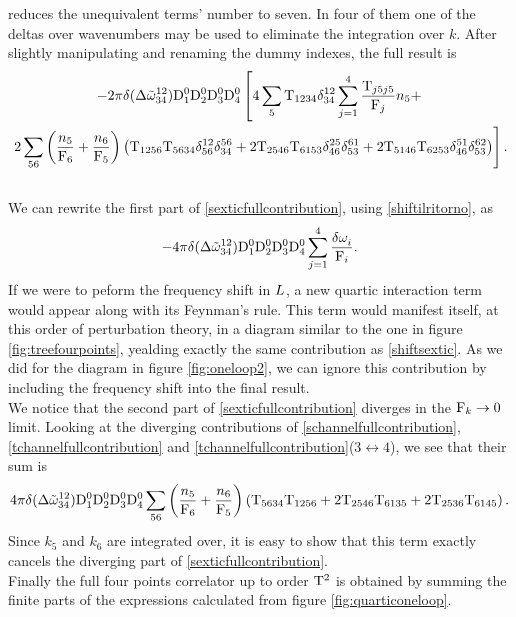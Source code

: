 reduces the unequivalent terms' number to seven. In four of them one of the deltas over wavenumbers may be used to eliminate the integration over $k$. After slightly manipulating
and renaming the dummy indexes, the full result is 
\begin{multline}
    -2\pi \delta(\Delta{\tilde{\omega}}^{12}_{34})\mathrm{D}_1^0\mathrm{D}_2^0\mathrm{D}_3^0\mathrm{D}_4^0\left[ 4\sum_5\mathrm{T}_{1234}\delta^{12}_{34} \sum_{j=1}^{4}\frac{\mathrm{T}_{j5j5}}{\mathrm{F}_j}n_5 + \right.\\ 
    \left.  2\sum_{56}\left( \frac{n_5}{\mathrm{F}_6} + \frac{n_6}{\mathrm{F}_5} \right)\left( \mathrm{T}_{1256}\mathrm{T}_{5634}\delta^{12}_{56}\delta^{56}_{34} 
    + 2\mathrm{T}_{2546}\mathrm{T}_{6153}\delta^{25}_{46}\delta^{61}_{53}
    + 2\mathrm{T}_{5146}\mathrm{T}_{6253}\delta^{51}_{46}\delta^{62}_{53} \right) \right].
    \label{sexticfullcontribution}
\end{multline}
\\
We can rewrite the first part of \eqref{sexticfullcontribution}, using \eqref{shiftilritorno}, as 
\begin{equation}
    -4\pi \delta(\Delta{\tilde{\omega}}^{12}_{34})\mathrm{D}_1^0\mathrm{D}_2^0\mathrm{D}_3^0\mathrm{D}_4^0\sum_{j=1}^{4}\frac{\delta \omega^{}_i}{\mathrm{F}_i}.
    \label{shiftsextic}
\end{equation}
If we were to peform the frequency shift in $L$, a new quartic interaction term would appear along with its Feynman's rule. 
This term would manifest itself, at this order of perturbation theory, in a diagram similar to the one in figure \ref{fig:treefourpoints}, 
yealding exactly the same contribution as \eqref{shiftsextic}. As we did for the diagram in figure \ref{fig:oneloop2}, we can ignore this contribution by including
the frequency shift into the final result. \\
We notice that the second part of \eqref{sexticfullcontribution} diverges in the $\mathrm{F}_k \rightarrow 0$ limit. Looking at the diverging contributions of 
\eqref{schannelfullcontribution}, \eqref{tchannelfullcontribution} and \eqref{tchannelfullcontribution}($3 \leftrightarrow 4$), we see that their sum is
\begin{equation}
    4\pi\delta(\Delta{\tilde{\omega}}^{12}_{34})\mathrm{D}_1^0\mathrm{D}_2^0\mathrm{D}_3^0\mathrm{D}_4^0\sum_{56}\left( \frac{n_5}{\mathrm{F}_6} + \frac{n_6}{\mathrm{F}_5}\right)\left(
    \mathrm{T}_{5634}\mathrm{T}_{1256} + 2 \mathrm{T}_{2546}\mathrm{T}_{6135} + 2\mathrm{T}_{2536}\mathrm{T}_{6145}
    \right).
\end{equation}
Since $k_5$ and $k_6$ are integrated over, it is easy to show that this term exactly cancels the diverging part of \eqref{sexticfullcontribution}.\\
Finally the full four points correlator up to order $\mathrm{T}^2$ is obtained by summing the finite parts of the expressions calculated from figure \ref{fig:quarticoneloop}.
